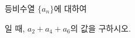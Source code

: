 \hspace*{2mm}\begin{minipage}[t]{\dimexpr\linewidth-2mm\relax}\vspace{0pt}
등비수열 $\{a_n\}$에 대하여 \par\smallskip{}\par\smallskip\noindent 일 때, $a_2+a_4+a_6$의 값을 구하시오.\end{minipage}
